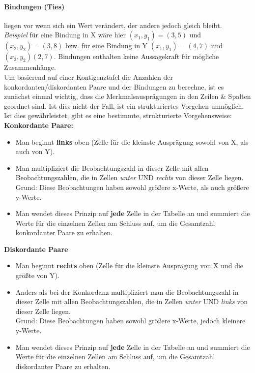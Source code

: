 \documentclass[a4paper]{article}
\begin{document}
\paragraph{Bindungen (Ties)} liegen vor wenn sich ein Wert verändert, der andere jedoch gleich bleibt.\\ 
\textit{Beispiel} für eine Bindung in X wäre hier $(x_1,y_1)=(3,5)$ und $(x_2,y_2)=(3,8)$ bzw. für eine Bindung in Y $(x_1,y_1)=(4,7)$ und $(x_2,y_2)(2,7)$. Bindungen enthalten keine Aussagekraft für mögliche Zusammenhänge.\\

\noindent Um basierend auf einer Kontigenztafel die Anzahlen der konkordanten/diskordanten Paare und der Bindungen zu berechne, ist es zunächst einmal wichtig, dass die Merkmalsausprägungen in den Zeilen \& Spalten geordnet sind. Ist dies nicht der Fall, ist ein strukturiertes Vorgehen unmöglich. Ist dies gewährleistet, gibt es eine bestimmte, strukturierte Vorgehensweise:\\

\noindent \textbf{Konkordante Paare:}
\begin{itemize}
    \item Man beginnt \textbf{links} oben (Zelle für die kleinste Ausprägung sowohl von X, als auch von Y).
    \item Man multipliziert die Beobachtungszahl in dieser Zelle mit allen Beobachtungszahlen, die in Zellen \textit{unter} UND \textit{rechts} von dieser Zelle liegen.\\
    Grund: Diese Beobachtungen haben sowohl größere x-Werte, als auch größere y-Werte.
    \item Man wendet dieses Prinzip auf \textbf{jede} Zelle in der Tabelle an und summiert die Werte für die einzelnen Zellen am Schluss auf, um die Gesamtzahl konkordanter Paare zu erhalten.
\end{itemize}

\noindent \textbf{Diskordante Paare}
\begin{itemize}
    \item Man beginnt \textbf{rechts} oben (Zelle für die kleinste Ausprägung von X und die größte von Y).
    \item Anders als bei der Konkordanz multipliziert man die Beobachtungszahl in dieser Zelle mit allen Beobachtungszahlen, die in Zellen \textit{unter} UND \textit{links} von dieser Zelle liegen.\\
    Grund: Diese Beobachtungen haben sowohl größere x-Werte, jedoch kleinere y-Werte.
    \item Man wendet dieses Prinzip auf \textbf{jede} Zelle in der Tabelle an und summiert die Werte für die einzelnen Zellen am Schluss auf, um die Gesamtzahl diskordanter Paare zu erhalten.
\end{itemize}
\end{document}
